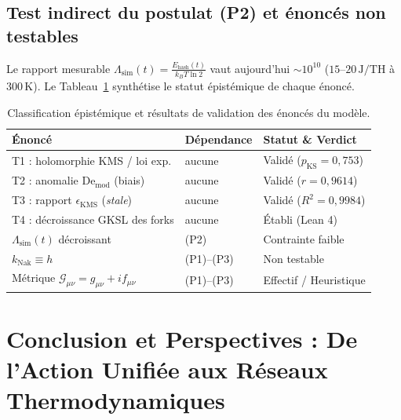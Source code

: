 \documentclass[10pt,twocolumn,a4paper]{article}
\theoremstyle{plain}
\theoremstyle{definition}
\theoremstyle{remark}
\newcommand{\kNak}{k_{\text{Nak}}}
\begin{document}
\subsection{Test indirect du postulat (P2) et énoncés non testables}

Le rapport mesurable $\Lambda_{\text{sim}}(t) = \frac{E_{\text{hash}}(t)}{k_B T \ln 2}$ vaut aujourd'hui $\sim 10^{10}$ ($15\text{--}20\,\text{J/TH}$ à $300\,\text{K}$). Le Tableau~\ref{tab:falsifiability} synthétise le statut épistémique de chaque énoncé.

\begin{table}[!htbp]
\centering
\caption{Classification épistémique et résultats de validation des énoncés du modèle.}
\label{tab:falsifiability}
\footnotesize
\renewcommand{\arraystretch}{1.22}
\begin{tabularx}{\linewidth}{@{} >{\raggedright\arraybackslash}X l >{\raggedright\arraybackslash}p{2.85cm} @{}}
\toprule
\textbf{Énoncé} & \textbf{Dépendance} & \textbf{Statut \& Verdict} \\
\midrule
T1 : holomorphie KMS / loi exp. & aucune & Validé ($p_{\text{KS}}=0{,}753$) \\
T2 : anomalie $\mathrm{De}_{\text{mod}}$ (biais) & aucune & Validé ($r=0{,}9614$) \\
T3 : rapport $\epsilon_{\text{KMS}}$ (\textit{stale}) & aucune & Validé ($R^2=0{,}9984$) \\
T4 : décroissance GKSL des forks & aucune & Établi (Lean 4) \\
$\Lambda_{\text{sim}}(t)$ décroissant & (P2) & Contrainte faible \\
$\kNak \equiv h$ & (P1)--(P3) & Non testable \\
Métrique $\mathcal{G}_{\mu\nu} = g_{\mu\nu} + i f_{\mu\nu}$ & (P1)--(P3) & Effectif / Heuristique \\
\bottomrule
\end{tabularx}
\end{table}

\section{Conclusion et Perspectives : De l'Action Unifiée aux Réseaux Thermodynamiques}
\label{sec:conclusion}
\end{document}
